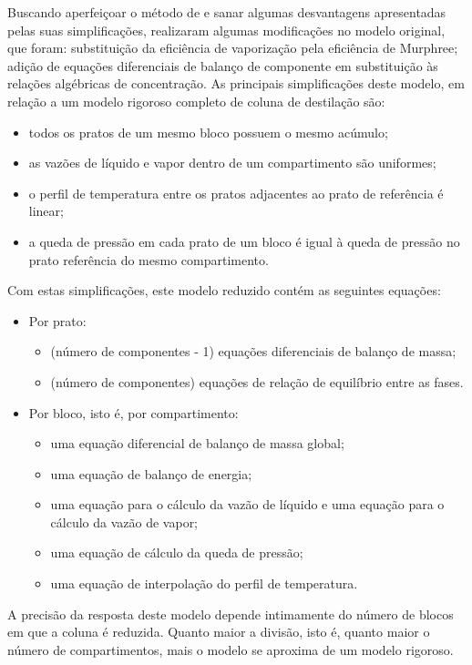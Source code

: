 \begin{enumerate}
Buscando aperfeiçoar o método de  e sanar algumas desvantagens apresentadas pelas suas
simplificações,  realizaram algumas modificações no modelo original, que foram: substituição da
eficiência de vaporização pela eficiência de Murphree; adição de equações diferenciais de
balanço de componente em substituição às relações algébricas de concentração. As principais simplificações deste modelo,
em relação a um modelo rigoroso completo de coluna de destilação são:
\begin{itemize}
\item todos os pratos de um mesmo bloco possuem o mesmo acúmulo;
\item as vazões de líquido e vapor dentro de um compartimento são uniformes;
\item o perfil de temperatura entre os pratos adjacentes ao prato de referência é linear;
\item a queda de pressão em cada prato de um bloco é igual à queda de pressão no prato referência do mesmo compartimento.
\end{itemize}

Com estas simplificações, este modelo reduzido contém as seguintes equações:
\begin{itemize}
\item Por prato:
	\begin{itemize}
	\item (número de componentes - 1) equações diferenciais de balanço de massa;
	\item (número de componentes) equações de relação de equilíbrio entre as fases.
	\end{itemize}
\item Por bloco, isto é, por compartimento:
	\begin{itemize}
	\item uma equação diferencial de balanço de massa global;
	\item uma equação de balanço de energia;
	\item uma equação para o cálculo da vazão de líquido e uma equação para o cálculo da vazão de vapor;
	\item uma equação de cálculo da queda de pressão;
	\item uma equação de interpolação do perfil de temperatura.
	\end{itemize}
\end{itemize}

A precisão da resposta deste modelo depende intimamente do número de blocos em que a coluna é reduzida. Quanto maior a
divisão, isto é, quanto maior o número de compartimentos, mais o modelo se aproxima de um modelo rigoroso.


\end{enumerate}
